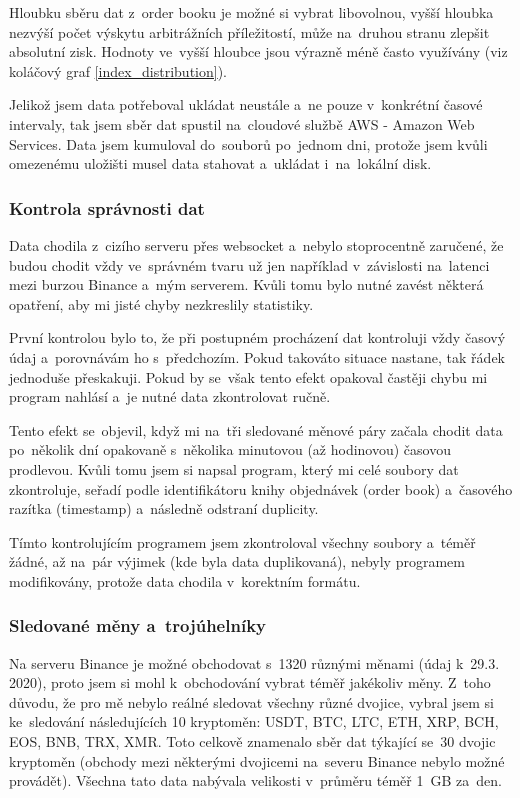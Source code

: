 \documentclass[thesis=B,czech]{FITthesis}[2019/03/21]
\begin{document}
Hloubku sběru dat z~order booku je možné si vybrat libovolnou, vyšší hloubka nezvýší počet výskytu arbitrážních příležitostí, může na~druhou stranu zlepšit absolutní zisk. Hodnoty ve~vyšší hloubce jsou výrazně méně často využívány (viz koláčový graf \ref{index_distribution}).

Jelikož jsem data potřeboval ukládat neustále a~ne pouze v~konkrétní časové intervaly, tak jsem sběr dat spustil na~cloudové službě AWS - Amazon Web Services. Data jsem kumuloval do~souborů po~jednom dni, protože jsem kvůli omezenému uložišti musel data stahovat a~ukládat i~na~lokální disk.

\subsubsection{Kontrola správnosti dat}
Data chodila z~cizího serveru přes websocket a~nebylo stoprocentně zaručené, že budou chodit vždy ve~správném tvaru už jen například v~závislosti na~latenci mezi burzou Binance a~mým serverem. Kvůli tomu bylo nutné zavést některá opatření, aby mi jisté chyby nezkreslily statistiky.

První kontrolou bylo to, že při postupném procházení dat kontroluji vždy časový údaj a~porovnávám ho s~předchozím. Pokud takováto situace nastane, tak řádek jednoduše přeskakuji. Pokud by se~však tento efekt opakoval častěji chybu mi program nahlásí a~je nutné data zkontrolovat ručně.  

Tento efekt se~objevil, když mi na~tři sledované měnové páry začala chodit data po~několik dní opakovaně s~několika minutovou (až hodinovou) časovou prodlevou. Kvůli tomu jsem si napsal program, který mi celé soubory dat zkontroluje, seřadí podle identifikátoru knihy objednávek (order book) a~časového razítka (timestamp) a~následně odstraní duplicity. 

Tímto kontrolujícím programem jsem zkontroloval všechny soubory a~téměř žádné, až na~pár výjimek (kde byla data duplikovaná), nebyly programem modifikovány, protože data chodila v~korektním formátu.

\subsubsection{Sledované měny a~trojúhelníky}
Na serveru Binance je možné obchodovat s~1320 různými měnami (údaj k~29.3. 2020), proto jsem si mohl k~obchodování vybrat téměř jakékoliv měny. Z~toho důvodu, že pro mě nebylo reálné sledovat všechny různé dvojice, vybral jsem si ke~sledování následujících 10 kryptoměn: USDT, BTC, LTC, ETH, XRP, BCH, EOS, BNB, TRX, XMR. Toto celkově znamenalo sběr dat týkající se~30 dvojic kryptoměn (obchody mezi některými dvojicemi na~severu Binance nebylo možné provádět). Všechna tato data nabývala velikosti v~průměru téměř 1~GB za~den.
\end{document}

